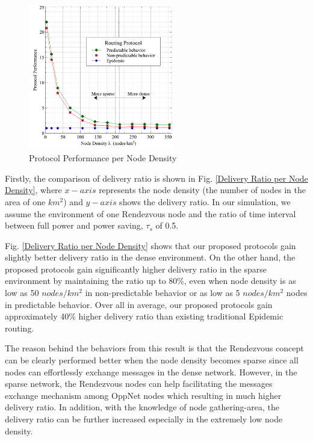 \documentclass[conference]{IEEEtran}
\begin{document}
\begin{figure}[!t]
\centering
\includegraphics[width=2.5in]{Graphs/ProtocolPerformance.pdf}
\caption{Protocol Performance per Node Density}
\label{Protocol Performance per Node Density}
\end{figure}

Firstly, the comparison of delivery ratio is shown in Fig. \ref{Delivery Ratio per Node Density}, where $x-axis$ represents the node density (the number of nodes in the area of one $km^2$) and $y-axis$ shows the delivery ratio.
In our simulation, we assume the environment of one Rendezvous node and the ratio of time interval between full power and power saving, $\tau_s$ of 0.5.

Fig. \ref{Delivery Ratio per Node Density} shows that our proposed protocols gain slightly better delivery ratio in the dense environment.
On the other hand, the proposed protocols gain significantly higher delivery ratio in the sparse environment by maintaining the ratio up to 80\%, even when node density is as low as 50 $nodes/km^2$ in non-predictable behavior or as low as 5 $nodes/km^2$ nodes in predictable behavior.
Over all in average, our proposed protocols gain approximately 40\% higher delivery ratio than existing traditional Epidemic routing.

The reason behind the behaviors from this result is that the Rendezvous concept can be clearly performed better when the node density becomes sparse since all nodes can effortlessly exchange messages in the dense network.
However, in the sparse network, the Rendezvous nodes can help facilitating the messages exchange mechanism among OppNet nodes which resulting in much higher delivery ratio.
In addition, with the knowledge of node gathering-area, the delivery ratio can be further increased especially in the extremely low node density.
\end{document}
